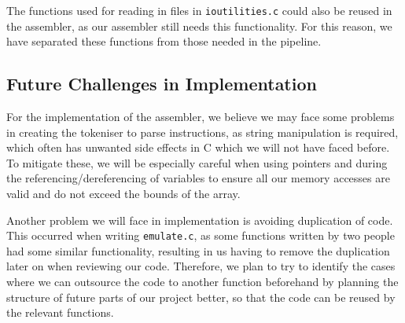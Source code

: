 \documentclass[11pt]{article}
\begin{document}
The functions used for reading in files in \texttt{ioutilities.c} could also be reused in the assembler, as our assembler still needs this functionality. For this reason, we have separated these functions from those needed in the pipeline.

\subsection{Future Challenges in Implementation}

For the implementation of the assembler, we believe we may face some problems in creating the tokeniser to parse instructions, as string manipulation is required, which often has unwanted side effects in C which we will not have faced before. To mitigate these, we will be especially careful when using pointers and during the referencing/dereferencing of variables to ensure all our memory accesses are valid and do not exceed the bounds of the array. 

Another problem we will face in implementation is avoiding duplication of code. This occurred when writing \texttt{emulate.c}, as some functions written by two people had some similar functionality, resulting in us having to remove the duplication later on when reviewing our code. Therefore, we plan to try to identify the cases where we can outsource the code to another function beforehand by planning the structure of future parts of our project better, so that the code can be reused by the relevant functions. 

\end{document}
